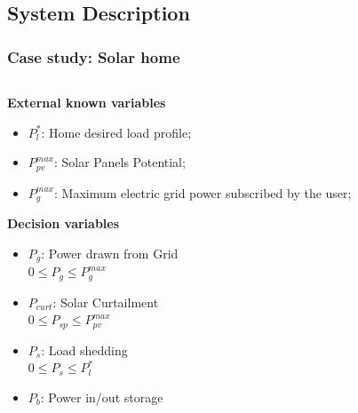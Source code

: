 \documentclass{beamer}
\begin{document}
\subsection{System Description}
\begingroup
\fontsize{10}{11}\selectfont
\begin{frame}

\frametitle{Case study: Solar home}

\begin{columns}
    \begin{column}{0.45\textwidth} 
        \pause \textbf{ External known variables}
        \begin{itemize}
            \item $P_{l}^*$: Home desired load profile;
            \vspace{3px} 
            \pause \item $P_{pv}^{max}$: Solar Panels Potential;
            \vspace{3px} 
            \pause \item $P_{g}^{max}$: Maximum electric grid power subscribed  by the user;
            
        \end{itemize} 
        \vspace{7px} 
        \pause \textbf{Decision variables}
        \begin{itemize}
            \item $P_{g}$: Power drawn from Grid \\
                \qquad $0 \leq P_{g} \leq P_{g}^{max}$
                \vspace{2px} 
            \pause \item $P_{curt}$:  Solar Curtailment \\ 
                \qquad $0 \leq P_{sp} \leq P_{pv}^{max}$ \quad \hspace{5px}
                \vspace{2px} 
            \pause \item $P_{s}$:  Load shedding \\
                \qquad $0 \leq P_{s} \leq P_{l}^*$ \quad 
                \vspace{2px} 
            \pause \item $P_{b}$:  Power in/out storage
        \end{itemize}
       \end{column}
    

\end{columns}
\end{frame}
\end{document}
